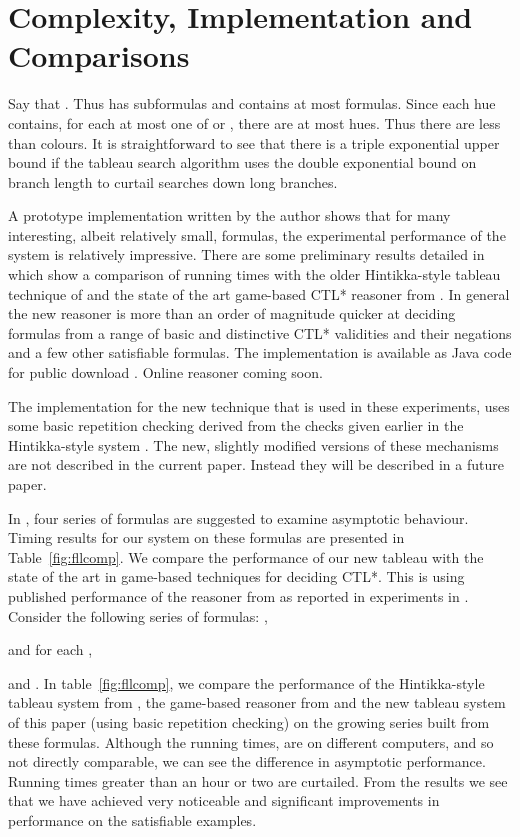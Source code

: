 \documentclass[submission,copyright,creativecommons]{eptcs}
\begin{document}
\section{Complexity, Implementation and Comparisons}
\label{sec:complex}

Say that .
Thus  has  subformulas
and  contains
at most  formulas.
Since each hue contains,
for each  at most
one of  or ,
there are at most
 hues.
Thus there are
less than  colours.
It is straightforward to see that there
is a triple exponential upper bound
if the tableau search algorithm
uses the double exponential bound on branch length
\cite{Rey:startab}
to curtail searches down long branches.

A prototype implementation written by the author
shows that for many interesting, albeit relatively small,
formulas, the experimental performance
of the system is relatively impressive.
There are some preliminary results 
detailed in
\cite{Rey:fasttablong}
which show a comparison of running times
with the older Hintikka-style tableau technique
of \cite{Rey:startab}
and the 
state of the art game-based CTL* reasoner from
 \cite{FLL10}.
 In general the new reasoner is more than an order
 of magnitude quicker at deciding
 formulas
 from a range of basic and distinctive
 CTL* validities and their negations
 and a few other satisfiable formulas.
 The implementation is available as Java code
 for public download \cite{Rey:fasttablong}.
 Online reasoner coming soon.

The implementation
for the new technique that is used in these experiments,
uses some basic repetition checking
derived from the
checks given earlier in the Hintikka-style system \cite{Rey:startab}.
The new, slightly modified
versions of these mechanisms are not described in the current paper.
Instead they will be described in a future paper.

In \cite{FLL10},
four series of formulas are suggested to 
examine asymptotic behaviour.
Timing results for our system 
on these formulas are
presented in Table~\ref{fig:fllcomp}.
We compare
the performance of our new tableau with
the state of the art in game-based
techniques for deciding CTL*.
This is using published performance
of the reasoner from \cite{FLL10}
as reported in experiments 
in \cite{DBLP:journals/entcs/McCabe-Dansted11}.
Consider the following series of formulas:
,

and for each ,

and
.
In table~\ref{fig:fllcomp},
we compare the performance of the 
Hintikka-style tableau system from
\cite{Rey:startab},
the game-based reasoner
from \cite{FLL10} and
the new tableau system of this paper
(using basic repetition checking)
on the growing series built from these formulas.
Although the running times, are on different computers,
and so not directly comparable,
we can see the difference in asymptotic performance.
Running times greater than an hour or two are curtailed.
From the results we see that
we have achieved 
very noticeable and significant improvements
in performance
on the satisfiable examples.
\end{document}
